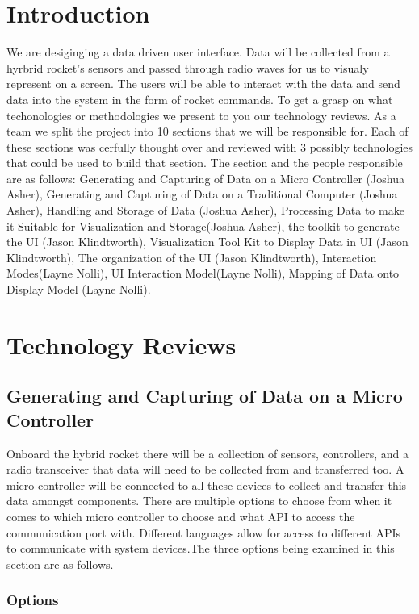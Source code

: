 \documentclass[10pt,draftclsnofoot,onecolumn]{IEEEtran}
\begin{document}
\section{Introduction}
We are desiginging a data driven user interface. Data will be collected from a hyrbrid rocket's sensors and passed through radio waves for us to visualy represent on a screen. The users will be able to interact with the data and send data into the system in the form of rocket commands. To get a grasp on what techonologies or methodologies we present to you our technology reviews. As a team we split the project into 10 sections that we will be responsible for. Each of these sections was cerfully thought over and reviewed with 3 possibly technologies that could be used to build that section. The section and the people responsible are as follows: Generating and Capturing of Data on a Micro Controller (Joshua Asher), Generating and Capturing of Data on a Traditional Computer (Joshua Asher), Handling and Storage of Data (Joshua Asher), Processing Data to make it Suitable for Visualization and Storage(Joshua Asher), the toolkit to generate the UI (Jason Klindtworth), Visualization Tool Kit to Display Data in UI (Jason Klindtworth), The organization of the UI (Jason Klindtworth), Interaction Modes(Layne Nolli), UI Interaction Model(Layne Nolli), Mapping of Data onto Display Model (Layne Nolli). 

\section{Technology Reviews}
\subsection{Generating and Capturing of Data on a Micro Controller}
Onboard the hybrid rocket there will be a collection of sensors, controllers, and a radio transceiver that data will need to be collected from and transferred too. A micro controller will be connected to all these devices to collect and transfer this data amongst components. There are multiple options to choose from when it comes to which micro controller to choose and what API to access the communication port with. Different languages allow for access to different APIs to communicate with system devices.The three options being examined in this section are as follows. \\
\subsubsection{Options}
\end{document}
